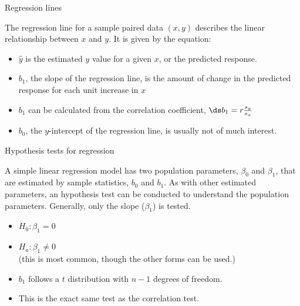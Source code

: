 \documentclass[xcolor=table, aspectratio=169, bigger]{beamer}
\begin{document}
\begin{frame}{Regression lines}
\begin{block}{}
The regression line for a sample paired data $(x,y)$ describes the linear relationship between $x$ and $y$. It is given by the equation:\\
\medskip
{}
\smallskip
\begin{itemize}
\pause\item $\hat y$ is the estimated $y$ value for a given $x$, or the predicted response.
\pause\item $b_1$, the slope of the regression line, is the amount of change in the predicted response for each unit increase in $x$
\pause\item $b_1$ can be calculated from the correlation coefficient, $\ds b_1 = r \frac{s_y}{s_x}$
\pause\item $b_0$, the $y$-intercept of the regression line, is usually not of much interest.
\end{itemize}
\end{block}
\end{frame}

\begin{frame}{Hypothesis tests for regression}

\begin{block}{}
A simple linear regression model has two population parameters, $\beta_0$ and $\beta_1$, that are estimated by sample statistics, $b_0$ and $b_1$. As with other estimated parameters, an hypothesis test can be conducted to understand the population parameters. Generally, only the slope ($\beta_1$) is tested.

\begin{itemize}
\pause\item $H_0: \beta_1 = 0$
\pause\item $H_a: \beta_1 \ne 0$ \\ (this is most common, though the other forms can be used.)
\pause\item $b_1$ follows a $t$ distribution with $n-1$ degrees of freedom.
\pause\item This is the exact same test as the correlation test.
\end{itemize}

\end{block}
\end{frame}
\end{document}
